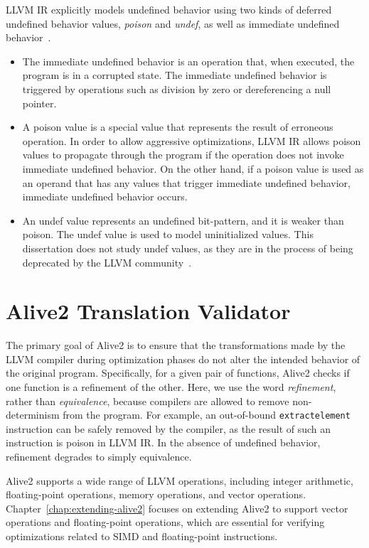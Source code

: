 LLVM IR explicitly models undefined behavior using
two kinds of deferred undefined behavior values, \emph{poison} and
\emph{undef}, as well as immediate undefined behavior~\cite{taming}.

\begin{itemize}
%
\item The immediate undefined behavior is an operation that, when
executed, the program is in a corrupted state.
%
The immediate undefined behavior is triggered by operations such as
division by zero or dereferencing a null pointer.

\item A poison value is a special value that represents the result of
erroneous operation.
%
In order to allow aggressive optimizations, LLVM IR allows poison
values to propagate through the program if the operation does not
invoke immediate undefined behavior.
%
On the other hand, if a poison value is used as an operand that has
any values that trigger immediate undefined behavior, immediate
undefined behavior occurs.

\item An undef value represents an undefined bit-pattern, and it is
weaker than poison. The undef value is used to model uninitialized
values.
%
This dissertation does not study undef values, as they are in the
process of being deprecated by the LLVM community~\cite{killundef}.
\end{itemize}

\section {Alive2 Translation Validator}

The primary goal of Alive2 is to ensure that the transformations made
by the LLVM compiler during optimization phases do not alter the
intended behavior of the original program.
%
Specifically, for a given pair of functions,
Alive2 checks if one function is a refinement of the other.
%
Here, we use the word \emph{refinement}, rather than \emph{equivalence},
because compilers are allowed to remove non-determinism from the
program.
%
For example, an out-of-bound \texttt{extractelement} instruction can
be safely removed by the compiler, as the result of such an
instruction is poison in LLVM IR.
%
In the absence of undefined behavior, refinement degrades to
simply equivalence.

Alive2 supports a wide range of LLVM operations, including integer
arithmetic, floating-point operations, memory operations, and vector
operations.
%
Chapter~\ref{chap:extending-alive2} focuses on extending Alive2 to
support vector operations and floating-point operations, which are
essential for verifying optimizations related to SIMD and
floating-point instructions.

